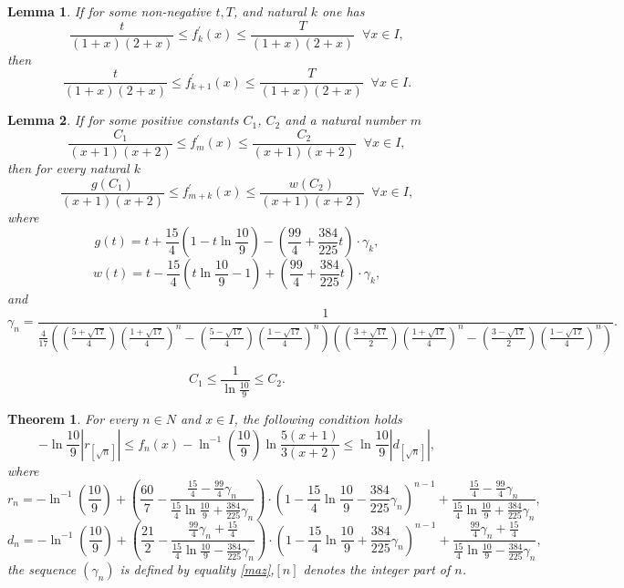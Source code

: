 \documentclass[10pt,a4paper]{amsart}
\newtheorem{lemma}{Lemma}
\newtheorem{theorem}{Theorem}
\begin{document}
\begin{lemma}\label{lema6}
   If for some non-negative $t,T$, and natural $k$ one has $$
   \frac{t}{(1+x)(2+x)}\leq f_{k}^{\prime}(x)\leq\frac{T}{(1+x)(2+x)}\;\;\forall x\in I,
   $$ then
  \begin{equation}\label{eq}
    \frac{t}{(1+x)(2+x)}\leq f_{k+1}^{\prime}(x)\leq\frac{T}{(1+x)(2+x)}\;\;\forall x\in I.
  \end{equation}
 \end{lemma}

\begin{lemma}\label{lema7}
  If for some positive constants $C_1$, $C_2$ and a natural number $m$ 
  $$\frac{C_1}{(x+1)(x+2)}\leq   f_m^{\prime} (x) \leq  \frac{C_2}{(x+1)(x+2)} \;\; \forall x \in I,    $$
 then for every natural $k$
  $$\frac{g(C_1)}{(x+1)(x+2)}\leq   f_{m+k}^{\prime}(x) \leq  \frac{w(C_2)}{(x+1)(x+2)} \;\; \forall x \in I,    $$
  where
$$g(t)=t+\frac{15}{4}\left(1-t\ln\frac{10}{9}\right)-\left(\frac{99}{4}+\frac{384}{225}t\right)\cdot\gamma_k,$$
$$
w(t)=t-\frac{15}{4}\left(t\ln\frac{10}{9}-1\right)+\left(\frac{99}{4}+\frac{384}{225}t\right)\cdot\gamma_{k},
$$
and
\begin{equation}\label{maz}
\gamma_{n}=\frac{1}{\frac{4}{17}((\frac{5+\sqrt{17}}{4})(\frac{1+\sqrt{17}}{4})^{n}-(\frac{5-\sqrt{17}}{4})(\frac{1-\sqrt{17}}{4})^{n})
 ((\frac{3+\sqrt{17}}{2})(\frac{1+\sqrt{17}}{4})^{n}-(\frac{3-\sqrt{17}}{2})(\frac{1-\sqrt{17}}{4})^{n})}.
\end{equation}
\end{lemma}

\begin{equation}\label{eqit}
C_1 \leq \frac{1}{\ln\frac{10}{9}} \leq C_2.
\end{equation}

\begin{theorem}
For every $n\in N$ and $x\in I$, the following condition holds
\begin{equation}\label{mr}
  -\ln\frac{10}{9}|r_{[\sqrt{n}]}|\leq f_n(x)-\ln^{-1}\left(\frac{10}{9}\right)\ln\frac{5(x+1)}{3(x+2)}
\leq\ln\frac{10}{9}|d_{[\sqrt{n}]}|,
\end{equation}
where
$$
r_{n}=-\ln^{-1}\left(\frac{10}{9}\right)+\left(\frac{60}{7}-\frac{\frac{15}{4}-\frac{99}{4}\gamma_n}
{\frac{15}{4}\ln\frac{10}{9}+\frac{384}{225}\gamma_n}\right)\cdot \left(1-\frac{15}{4}\ln\frac{10}{9}-\frac{384}{225}\gamma_n\right)^{n-1}+
\frac{\frac{15}{4}-\frac{99}{4}\gamma_n}{\frac{15}{4}\ln\frac{10}{9}+\frac{384}{225}\gamma_n},
$$
$$
d_{n}=-\ln^{-1}\left(\frac{10}{9}\right)+\left(\frac{21}{2}-\frac{\frac{99}{4}\gamma_n+\frac{15}{4}}
{\frac{15}{4}\ln\frac{10}{9}-\frac{384}{225}\gamma_n}\right)\cdot \left(1-\frac{15}{4}\ln\frac{10}{9}+\frac{384}{225}\gamma_n\right)^{n-1}+
 \frac{\frac{99}{4}\gamma_{n}+\frac{15}{4}}{\frac{15}{4}\ln\frac{10}{9}-\frac{384}{225}\gamma_n},
$$
the sequence $(\gamma_{n})$ is defined by equality \eqref{maz},$[n]$ denotes the integer part of $n$.
\end{theorem}
\end{document}

